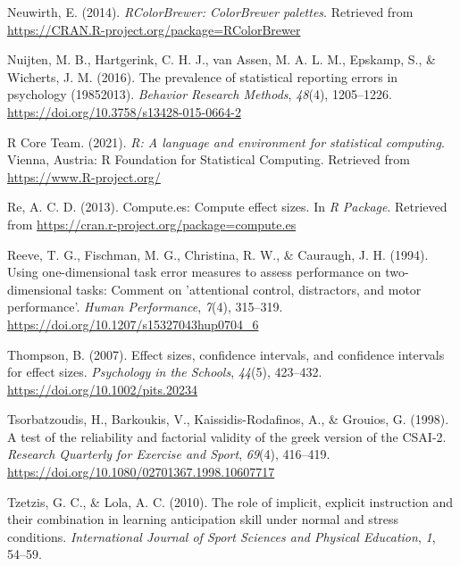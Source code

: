 \documentclass[
  english,
  man, donotrepeattitle,floatsintext]{apa7}
\newlength{\cslhangindent}
\newlength{\cslentryspacingunit} %
\newenvironment{CSLReferences}[2] %
 {%
  \setlength{\parindent}{0pt}
  \ifodd #1
  \let\oldpar\par
  \def\par{\hangindent=\cslhangindent\oldpar}
  \fi
  \setlength{\parskip}{#2\cslentryspacingunit}
 }%
 {}
\begin{document}
\begin{CSLReferences}{1}{0}
\leavevmode{}%
Neuwirth, E. (2014). \emph{RColorBrewer: ColorBrewer palettes}. Retrieved from \url{https://CRAN.R-project.org/package=RColorBrewer}

\leavevmode{}%
Nuijten, M. B., Hartgerink, C. H. J., van Assen, M. A. L. M., Epskamp, S., \& Wicherts, J. M. (2016). The prevalence of statistical reporting errors in psychology (1985{\textendash}2013). \emph{Behavior Research Methods}, \emph{48}(4), 1205--1226. \url{https://doi.org/10.3758/s13428-015-0664-2}

\leavevmode{}%
R Core Team. (2021). \emph{R: A language and environment for statistical computing}. Vienna, Austria: R Foundation for Statistical Computing. Retrieved from \url{https://www.R-project.org/}

\leavevmode{}%
Re, A. C. D. (2013). Compute.es: Compute effect sizes. In \emph{R Package}. Retrieved from \url{https://cran.r-project.org/package=compute.es}

\leavevmode{}%
Reeve, T. G., Fischman, M. G., Christina, R. W., \& Cauraugh, J. H. (1994). Using one-dimensional task error measures to assess performance on two-dimensional tasks: Comment on 'attentional control, distractors, and motor performance'. \emph{Human Performance}, \emph{7}(4), 315--319. \url{https://doi.org/10.1207/s15327043hup0704_6}

\leavevmode{}%
Thompson, B. (2007). Effect sizes, confidence intervals, and confidence intervals for effect sizes. \emph{Psychology in the Schools}, \emph{44}(5), 423--432. \url{https://doi.org/10.1002/pits.20234}

\leavevmode{}%
Tsorbatzoudis, H., Barkoukis, V., Kaissidis-Rodafinos, A., \& Grouios, G. (1998). A test of the reliability and factorial validity of the greek version of the CSAI-2. \emph{Research Quarterly for Exercise and Sport}, \emph{69}(4), 416--419. \url{https://doi.org/10.1080/02701367.1998.10607717}

\leavevmode{}%
Tzetzis, G. C., \& Lola, A. C. (2010). The role of implicit, explicit instruction and their combination in learning anticipation skill under normal and stress conditions. \emph{International Journal of Sport Sciences and Physical Education}, \emph{1}, 54--59.


\end{CSLReferences}
\end{document}
